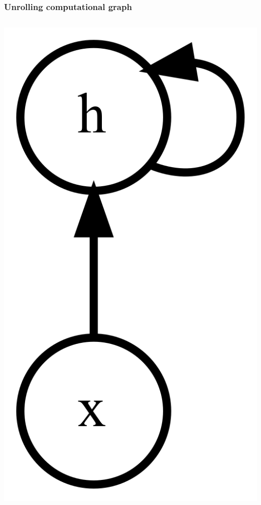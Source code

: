 \documentclass{beamer}
\begin{document}
\begin{frame}
  \frametitle{Unrolling computational graph}
  \begin{columns}
    \begin{column}{0.3\textwidth}
      \begin{center}
        \includegraphics[height=0.6\textheight]{../img/rnn-comp-graph.png}
      \end{center}

\end{column}
\end{columns}
\end{frame}
\end{document}
